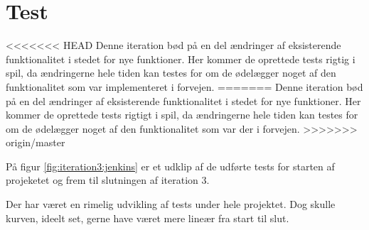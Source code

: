 \section{Test}

<<<<<<< HEAD
Denne iteration bød på en del ændringer af eksisterende funktionalitet i stedet for nye funktioner. Her kommer de oprettede tests rigtig i spil, da ændringerne hele tiden kan testes for om de ødelægger noget af den funktionalitet som var implementeret i forvejen.
=======
Denne iteration bød på en del ændringer af eksisterende funktionalitet i stedet for nye funktioner. Her kommer de oprettede tests rigtigt i spil, da ændringerne hele tiden kan testes for om de ødelægger noget af den funktionalitet som var der i forvejen.
>>>>>>> origin/master

På figur \ref{fig:iteration3:jenkins} er et udklip af de udførte tests for starten af projeketet og frem til slutningen af iteration 3.


Der har været en rimelig udvikling af tests under hele projektet. Dog skulle kurven, ideelt set, gerne have været mere lineær fra start til slut.